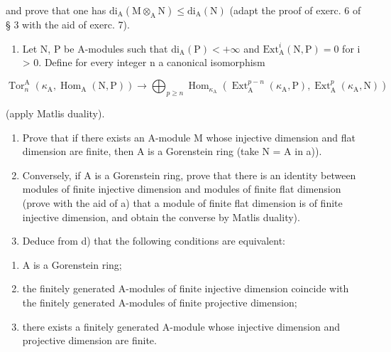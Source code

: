 and prove that one has \(\mathrm{di}_{\mathrm{A}}(\mathrm{M}\otimes_{\mathrm{A}}\mathrm{N})\leqslant \mathrm{di}_{\mathrm{A}}(\mathrm{N})\) (adapt the proof of exerc. 6 of § 3 with the aid of exerc. 7).

\begin{enumerate}
\def\labelenumi{\alph{enumi})}
\setcounter{enumi}{1}
\tightlist
\item
  Let N, P be A-modules such that \(\mathrm{di}_{\mathrm{A}}(\mathrm{P}) < +\infty\) and \(\mathrm{Ext}_{\mathrm{A}}^{i}(\mathrm{N},\mathrm{P}) = 0\) for i \textgreater{} 0. Define for every integer n a canonical isomorphism
\end{enumerate}

\[
\operatorname{Tor} _ {n} ^ {\mathrm{A}} \left(\kappa_ {\mathrm{A}}, \operatorname{Hom} _ {\mathrm{A}} (\mathrm{N}, \mathrm{P})\right) \longrightarrow \bigoplus_ {p \geqslant n} \operatorname{Hom} _ {\kappa_ {\mathrm{A}}} \left(\operatorname{Ext} _ {\mathrm{A}} ^ {p - n} \left(\kappa_ {\mathrm{A}}, \mathrm{P}\right), \operatorname{Ext} _ {\mathrm{A}} ^ {p} \left(\kappa_ {\mathrm{A}}, \mathrm{N}\right)\right)
\]

(apply Matlis duality).

\begin{enumerate}
\def\labelenumi{\alph{enumi})}
\setcounter{enumi}{2}
\item
  Prove that if there exists an A-module M whose injective dimension and flat dimension are finite, then A is a Gorenstein ring (take N = A in a)).
\item
  Conversely, if A is a Gorenstein ring, prove that there is an identity between modules of finite injective dimension and modules of finite flat dimension (prove with the aid of a) that a module of finite flat dimension is of finite injective dimension, and obtain the converse by Matlis duality).
\item
  Deduce from d) that the following conditions are equivalent:
\end{enumerate}

\begin{enumerate}
\def\labelenumi{(\roman{enumi})}
\item
  A is a Gorenstein ring;
\item
  the finitely generated A-modules of finite injective dimension coincide with the finitely generated A-modules of finite projective dimension;
\item
  there exists a finitely generated A-module whose injective dimension and projective dimension are finite.
\end{enumerate}

